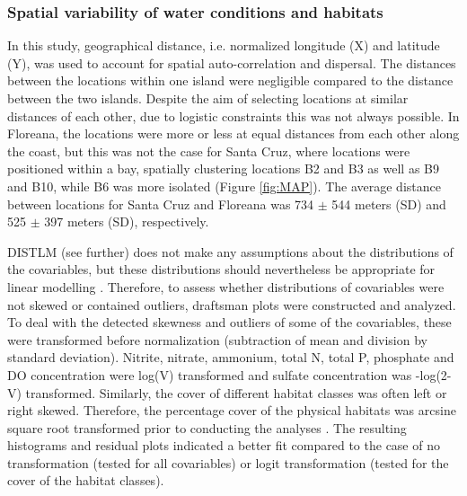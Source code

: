 \subsubsection{Spatial variability of water conditions and habitats}
\label{Methods:env_grouping}

In this study, geographical distance, i.e. normalized longitude (X) and latitude (Y), was used to account for spatial auto-correlation and dispersal. The distances between the locations within one island were negligible compared to the distance between the two islands. Despite the aim of selecting locations at similar distances of each other, due to logistic constraints this was not always possible. In Floreana, the locations were more or less at equal distances from each other along the coast, but this was not the case for Santa Cruz, where locations were positioned within a bay, spatially clustering locations B2 and B3 as well as B9 and B10, while B6 was more isolated (Figure \ref{fig:MAP}). The average distance between locations for Santa Cruz and Floreana was 734 $\pm$ 544 meters (SD) and 525 $\pm$ 397 meters (SD), respectively. 

DISTLM (see further) does not make any assumptions about the distributions of the covariables, but these distributions should nevertheless be appropriate for linear modelling \citep{Anderson2008PERMANOVA+Methods,Legendre1999Distance-basedExperiments}. Therefore, to assess whether distributions of covariables were not skewed or contained outliers, draftsman plots were constructed and analyzed. To deal with the detected skewness and outliers of some of the covariables, these were transformed before normalization (subtraction of mean and division by standard deviation). Nitrite, nitrate, ammonium, total N, total P, phosphate and DO concentration were log(V) transformed and sulfate concentration was -log(2-V) transformed. Similarly, the cover of different habitat classes was often left or right skewed. Therefore, the percentage cover of the physical habitats was arcsine square root transformed prior to conducting the analyses \citep{Gotelli2004AStatistics.}. The resulting histograms and residual plots indicated a better fit compared to the case of no transformation (tested for all covariables) or logit transformation (tested for the cover of the habitat classes).

